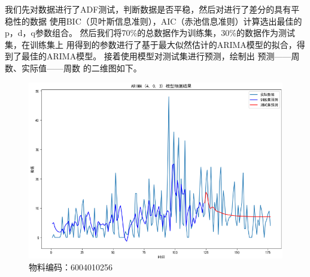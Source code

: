 \documentclass{cumcmthesis}
\begin{document}
        %

        我们先对数据进行了ADF测试，判断数据是否平稳，然后对进行了差分的具有平稳性的数据
        使用BIC（贝叶斯信息准则），AIC（赤池信息准则）计算选出最佳的p，d，q参数组合。
        然后我们将70\%的总数据作为训练集，30\%的数据作为测试集，在训练集上
        用得到的参数进行了基于最大似然估计的ARIMA模型的拟合，得到了最佳的ARIMA模型。
        接着使用模型对测试集进行预测，绘制出 预测——周数、实际值——周数 的二维图如下。\\

        \begin{figure}[ht]
            \centering
            \includegraphics[scale=0.8]{graph/graph_2.png}
            \caption{物料编码：6004010256}
            \label{fig:2}
        \end{figure}
        \FloatBarrier    %
        
\end{document}
